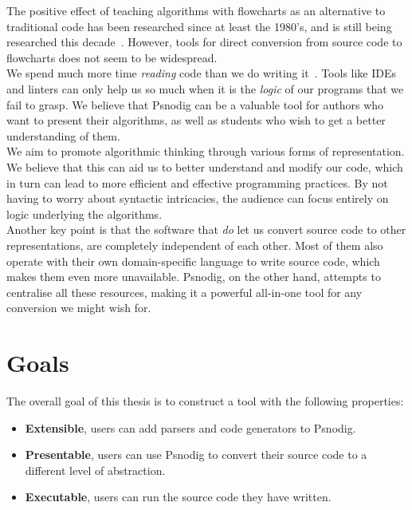 The positive effect of teaching algorithms with flowcharts as an alternative to traditional code has been researched since at least the 1980's, and is still being researched this decade~\cite{flowchartsAreGood1, flowchartsAreGood2, flowchartsAreGood3}. However, tools for direct conversion from source code to flowcharts does not seem to be widespread. \\

We spend much more time \textit{reading} code than we do writing it~\cite[14]{weReadMoreThanWeCode}. Tools like IDEs and linters can only help us so much when it is the \textit{logic} of our programs that we fail to grasp. We believe that Psnodig can be a valuable tool for authors who want to present their algorithms, as well as students who wish to get a better understanding of them. \\

We aim to promote algorithmic thinking through various forms of representation. We believe that this can aid us to better understand and modify our code, which in turn can lead to more efficient and effective programming practices. By not having to worry about syntactic intricacies, the audience can focus entirely on logic underlying the algorithms. \\

Another key point is that the software that \textit{do} let us convert source code to other representations, are completely independent of each other. Most of them also operate with their own domain-specific language to write source code, which makes them even more unavailable. Psnodig, on the other hand, attempts to centralise all these resources, making it a powerful all-in-one tool for any conversion we might wish for. \\

\section{Goals}

The overall goal of this thesis is to construct a tool with the following properties:

\begin{itemize}
    \item \textbf{Extensible}, users can add parsers and code generators to Psnodig.
    \item \textbf{Presentable}, users can use Psnodig to convert their source code to a different level of abstraction.
    \item \textbf{Executable}, users can run the source code they have written.
\end{itemize}

